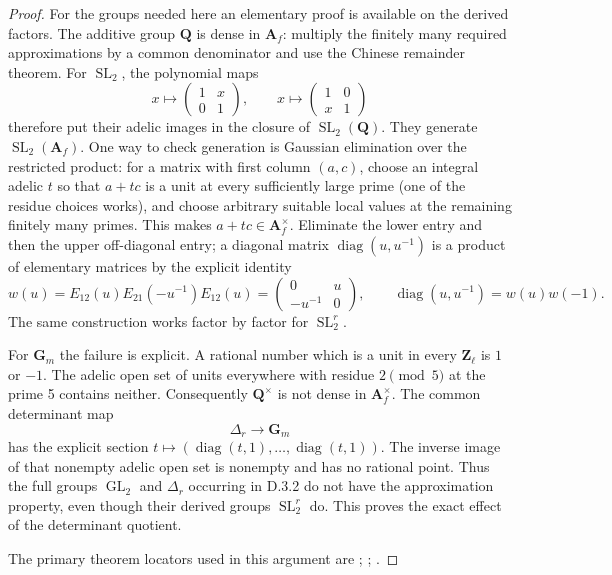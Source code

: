 \begin{proof}
For the groups needed here an elementary proof is available on the
derived factors. The additive group \(\mathbf Q\) is dense in
\(\mathbf A_f\): multiply the finitely many required approximations
by a common denominator and use the Chinese remainder theorem.
For \(\operatorname{SL}_2\), the polynomial maps
\[
x\longmapsto\begin{pmatrix}1&x\\0&1\end{pmatrix},\qquad
x\longmapsto\begin{pmatrix}1&0\\x&1\end{pmatrix}
\]
therefore put their adelic images in the closure of
\(\operatorname{SL}_2(\mathbf Q)\). They generate
\(\operatorname{SL}_2(\mathbf A_f)\). One way to check generation
is Gaussian elimination over the restricted product: for a matrix
with first column \((a,c)\), choose an integral adelic \(t\) so
that \(a+tc\) is a unit at every sufficiently large prime (one of
the residue choices works), and choose arbitrary suitable local
values at the remaining finitely many primes. This makes
\(a+tc\in\mathbf A_f^\times\). Eliminate the lower entry and then
the upper off-diagonal entry; a diagonal matrix
\(\operatorname{diag}(u,u^{-1})\) is a product of elementary
matrices by the explicit identity
\[
w(u)=E_{12}(u)E_{21}(-u^{-1})E_{12}(u)
=\begin{pmatrix}0&u\\-u^{-1}&0\end{pmatrix},\qquad
\operatorname{diag}(u,u^{-1})=w(u)w(-1).
\] The same construction
works factor by factor for \(\operatorname{SL}_2^r\).

For \(\mathbf G_m\) the failure is explicit. A rational number which
is a unit in every \(\mathbf Z_\ell\) is \(1\) or \(-1\).
The adelic open set of units everywhere with residue \(2\pmod5\)
at the prime 5 contains neither. Consequently
\(\mathbf Q^\times\) is not dense in \(\mathbf A_f^\times\).
The common determinant map
\[
\Delta_r\longrightarrow\mathbf G_m
\]
has the explicit section
\(t\mapsto(\operatorname{diag}(t,1),\ldots,
\operatorname{diag}(t,1))\). The inverse image of that nonempty
adelic open set is nonempty and has no rational point. Thus the
full groups \(\operatorname{GL}_2\) and \(\Delta_r\) occurring in
D.3.2 do not have the approximation property, even though their
derived groups \(\operatorname{SL}_2^r\) do. This proves the exact
effect of the determinant quotient.

The primary theorem locators used in this argument are \cite[Satz 1; Hilfss\"atze 2.3--2.5, pp.191--194]{GenKneser1965}; \cite[Theorem A, p.1140]{GenPlatonov1969}; \cite[\S\S2,5]{GenPlatonov1970}.
\end{proof}

